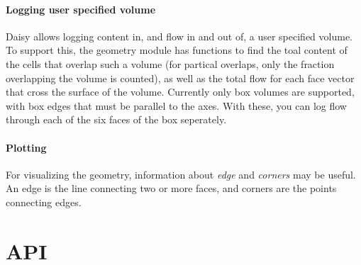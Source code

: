 \documentclass[a4paper,11pt,twoside]{article}
\begin{document}
\paragraph{Logging user specified volume}
Daisy allows logging content in, and flow in and out of, a user
specified volume.  To support this, the geometry module has functions
to find the toal content of the cells that overlap such a volume (for
partical overlaps, only the fraction overlapping the volume is
counted), as well as the total flow for each face vector that cross
the surface of the volume.  Currently only box volumes are supported,
with box edges that must be parallel to the axes.  With these, you can
log flow through each of the six faces of the box seperately.

\paragraph{Plotting}

For visualizing the geometry, information about \emph{edge} and
\emph{corners} may be useful.  An edge is the line connecting two or
more faces, and corners are the points connecting edges.

\section{API}
\end{document}
